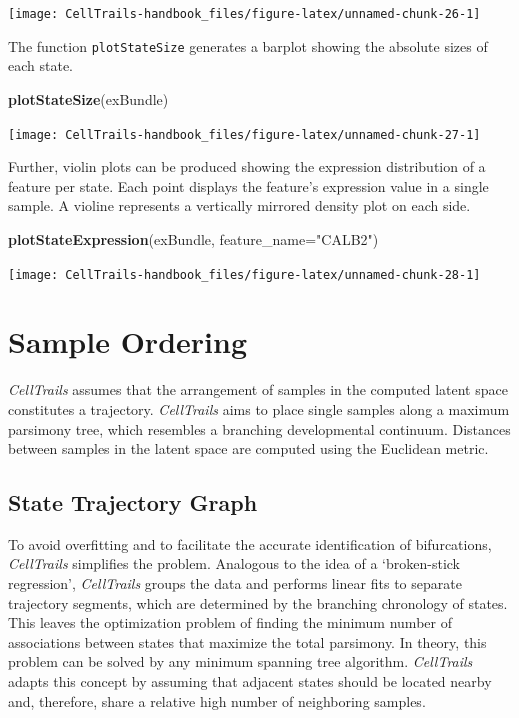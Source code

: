 \documentclass[]{book}
\newenvironment{Shaded}{\begin{snugshade}}{\end{snugshade}}
\newcommand{\KeywordTok}[1]{\textcolor[rgb]{0.13,0.29,0.53}{\textbf{#1}}}
\newcommand{\DataTypeTok}[1]{\textcolor[rgb]{0.13,0.29,0.53}{#1}}
\newcommand{\StringTok}[1]{\textcolor[rgb]{0.31,0.60,0.02}{#1}}
\newcommand{\NormalTok}[1]{#1}
\theoremstyle{definition}
\theoremstyle{definition}
\theoremstyle{definition}
\theoremstyle{remark}
\begin{document}
\texttt{[image: CellTrails-handbook\_files/figure-latex/unnamed-chunk-26-1]}

The function \texttt{plotStateSize} generates a barplot showing the
absolute sizes of each state.

\begin{Shaded}
\begin{Highlighting}[]
\KeywordTok{plotStateSize}\NormalTok{(exBundle)}
\end{Highlighting}
\end{Shaded}

\texttt{[image: CellTrails-handbook\_files/figure-latex/unnamed-chunk-27-1]}

Further, violin plots can be produced showing the expression
distribution of a feature per state. Each point displays the feature's
expression value in a single sample. A violine represents a vertically
mirrored density plot on each side.

\begin{Shaded}
\begin{Highlighting}[]
\KeywordTok{plotStateExpression}\NormalTok{(exBundle, }\DataTypeTok{feature_name=}\StringTok{"CALB2"}\NormalTok{)}
\end{Highlighting}
\end{Shaded}

\texttt{[image: CellTrails-handbook\_files/figure-latex/unnamed-chunk-28-1]}

\chapter{Sample Ordering}\label{sample-ordering}

\emph{CellTrails} assumes that the arrangement of samples in the
computed latent space constitutes a trajectory. \emph{CellTrails} aims
to place single samples along a maximum parsimony tree, which resembles
a branching developmental continuum. Distances between samples in the
latent space are computed using the Euclidean metric.

\section{State Trajectory Graph}\label{state-trajectory-graph}

To avoid overfitting and to facilitate the accurate identification of
bifurcations, \emph{CellTrails} simplifies the problem. Analogous to the
idea of a `broken-stick regression', \emph{CellTrails} groups the data
and performs linear fits to separate trajectory segments, which are
determined by the branching chronology of states. This leaves the
optimization problem of finding the minimum number of associations
between states that maximize the total parsimony. In theory, this
problem can be solved by any minimum spanning tree algorithm.
\emph{CellTrails} adapts this concept by assuming that adjacent states
should be located nearby and, therefore, share a relative high number of
neighboring samples.
\end{document}
